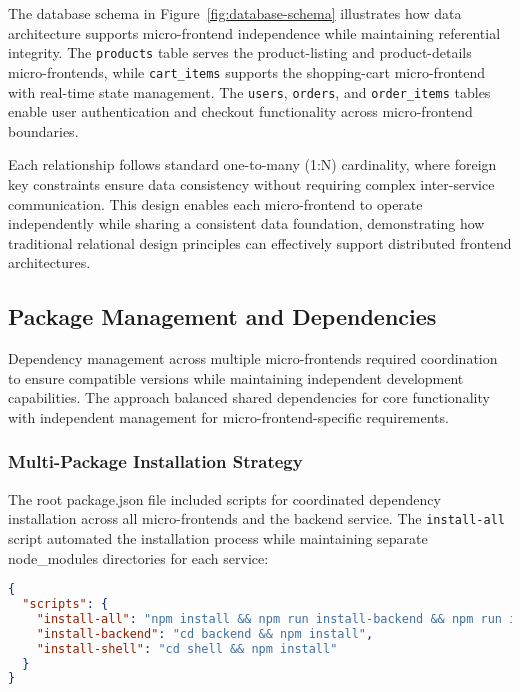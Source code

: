 \documentclass[12pt,a4paper]{report}
\begin{document}
The database schema in Figure~\ref{fig:database-schema} illustrates how data architecture supports micro-frontend independence while maintaining referential integrity. The \texttt{products} table serves the product-listing and product-details micro-frontends, while \texttt{cart\_items} supports the shopping-cart micro-frontend with real-time state management. The \texttt{users}, \texttt{orders}, and \texttt{order\_items} tables enable user authentication and checkout functionality across micro-frontend boundaries.

Each relationship follows standard one-to-many (1:N) cardinality, where foreign key constraints ensure data consistency without requiring complex inter-service communication. This design enables each micro-frontend to operate independently while sharing a consistent data foundation, demonstrating how traditional relational design principles can effectively support distributed frontend architectures.

\subsection{Package Management and Dependencies}

Dependency management across multiple micro-frontends required coordination to ensure compatible versions while maintaining independent development capabilities. The approach balanced shared dependencies for core functionality with independent management for micro-frontend-specific requirements.

\subsubsection{Multi-Package Installation Strategy}

The root package.json file included scripts for coordinated dependency installation across all micro-frontends and the backend service. The \texttt{install-all} script automated the installation process while maintaining separate node\_modules directories for each service:

\begin{lstlisting}[language=JSON, caption=Root Package.json Installation Scripts]
{
  "scripts": {
    "install-all": "npm install && npm run install-backend && npm run install-shell && npm run install-product-listing && npm run install-product-details && npm run install-shopping-cart",
    "install-backend": "cd backend && npm install",
    "install-shell": "cd shell && npm install"
  }
}
\end{lstlisting}
\end{document}
